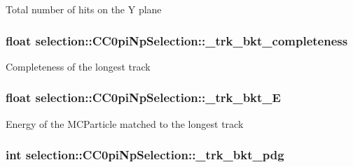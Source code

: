 Total number of hits on the Y plane \hypertarget{classselection_1_1CC0piNpSelection_aab22ce289e2d4a109440369e30fddf52}{
\subsubsection[{\-\_\-trk\-\_\-bkt\-\_\-completeness}]{\setlength{\rightskip}{0pt plus 5cm}float selection\-::\-C\-C0pi\-Np\-Selection\-::\-\_\-trk\-\_\-bkt\-\_\-completeness\hspace{0.3cm}{\ttfamily [private]}}}\label{classselection_1_1CC0piNpSelection_aab22ce289e2d4a109440369e30fddf52}
Completeness of the longest track \hypertarget{classselection_1_1CC0piNpSelection_aa7a6076f1169185e0b2b02fbb03aba22}{
\subsubsection[{\-\_\-trk\-\_\-bkt\-\_\-\-E}]{\setlength{\rightskip}{0pt plus 5cm}float selection\-::\-C\-C0pi\-Np\-Selection\-::\-\_\-trk\-\_\-bkt\-\_\-\-E\hspace{0.3cm}{\ttfamily [private]}}}\label{classselection_1_1CC0piNpSelection_aa7a6076f1169185e0b2b02fbb03aba22}
Energy of the M\-C\-Particle matched to the longest track \hypertarget{classselection_1_1CC0piNpSelection_a7044de37ee4f3615ffe4bb15e9f00f8e}{
\subsubsection[{\-\_\-trk\-\_\-bkt\-\_\-pdg}]{\setlength{\rightskip}{0pt plus 5cm}int selection\-::\-C\-C0pi\-Np\-Selection\-::\-\_\-trk\-\_\-bkt\-\_\-pdg\hspace{0.3cm}{\ttfamily [private]}}}\label{classselection_1_1CC0piNpSelection_a7044de37ee4f3615ffe4bb15e9f00f8e}
